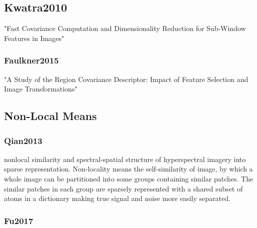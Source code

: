 \subsection{Kwatra2010}
"Fast Covariance Computation and
Dimensionality Reduction for Sub-Window Features in Images"

\subsubsection{Faulkner2015}
\cite{Faulkner2015} "A Study of the Region Covariance Descriptor: Impact of Feature Selection and Image Transformations"

\subsection{Non-Local Means}
\subsubsection{Qian2013}
\cite{Qian2013} 
nonlocal similarity and spectral-spatial structure of hyperspectral imagery into sparse representation. Non-locality means the self-similarity of image, by which a whole image can be partitioned into some groups containing similar patches. The similar patches in each group are sparsely represented with a shared subset of atoms in a dictionary making true signal and noise more easily separated.

\subsubsection{Fu2017}
\cite{Fu2017}